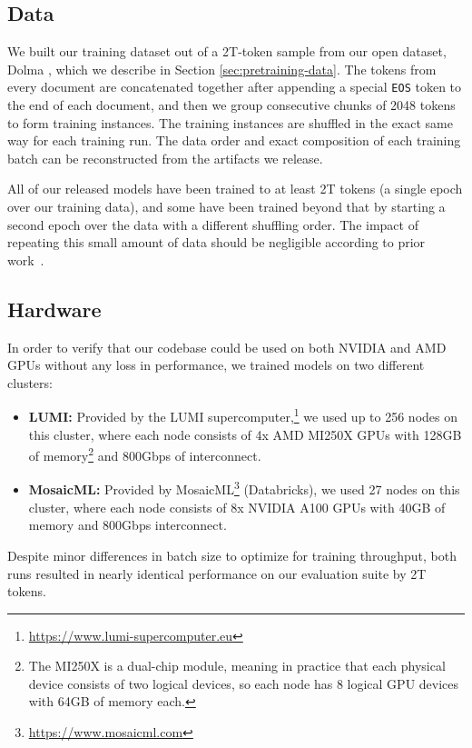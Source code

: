 \documentclass[11pt]{article}
\begin{document}
\subsection{Data}
\label{sec:training-data}

We built our training dataset out of a 2T-token sample from our open dataset, Dolma \citep{dolma}, which we describe in Section \ref{sec:pretraining-data}.
The tokens from every document are concatenated together after appending a special \texttt{EOS} token to the end of each document, and then we group consecutive chunks of 2048 tokens to form training instances.
The training instances are shuffled in the exact same way for each training run.
The data order and exact composition of each training batch can be reconstructed from the artifacts we release.

All of our released models have been trained to at least 2T tokens (a single epoch over our training data), and some have been trained beyond that by starting a second epoch over the data with a different shuffling order. The impact of repeating this small amount of data should be negligible according to prior work~\citep{muennighoff2023scaling}.

\subsection{Hardware} \label{sec:hardware}
In order to verify that our codebase could be used on both NVIDIA and AMD GPUs without any loss in performance, we trained models on two different clusters:
\begin{itemize}[noitemsep,leftmargin=4.5mm]
    \item \textbf{LUMI:} Provided by the LUMI supercomputer,\footnote{\url{https://www.lumi-supercomputer.eu}} we used up to 256 nodes on this cluster, 
where each node consists of 4x AMD MI250X GPUs with 128GB of memory\footnote{The MI250X is a dual-chip module, meaning in practice that each physical device consists of two logical devices, so each node has 8 logical GPU devices with 64GB of memory each.} and 800Gbps of interconnect.
    \item \textbf{MosaicML:} Provided by MosaicML\footnote{\url{https://www.mosaicml.com}} (Databricks), we used 27 nodes on this cluster, where each node consists of 8x NVIDIA A100 GPUs with 40GB of memory and 800Gbps interconnect.
\end{itemize}
Despite minor differences in batch size to optimize for training throughput, both runs resulted in nearly identical performance on our evaluation suite by 2T tokens.
\end{document}
